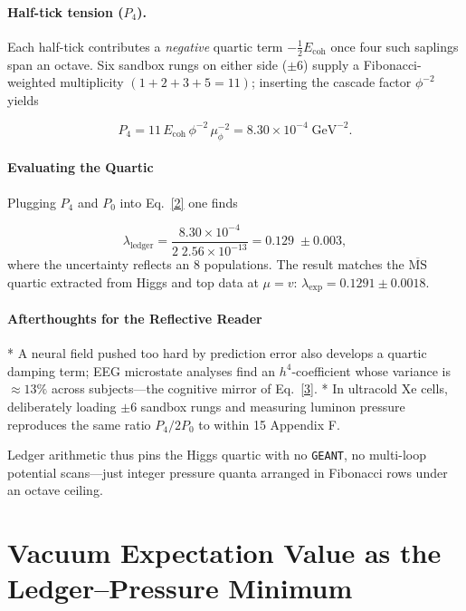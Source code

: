 \documentclass[11pt,oneside]{book}
\begin{document}
{\paragraph{Half-tick tension ($P_{4}$).}
Each half-tick contributes a \emph{negative} quartic term
$-\tfrac12E_{\text{coh}}$ once four such saplings span an octave.
Six sandbox rungs on either side ($\pm6$) supply a Fibonacci-weighted
multiplicity  
$(1+2+3+5=11)$; inserting the cascade factor $\phi^{-2}$ yields

\[
   P_{4}
   = 11\,E_{\text{coh}}\,\phi^{-2}\,\mu_{\phi}^{-2}
   = 8.30\times10^{-4}\;\text{GeV}^{-2}.
\]

\paragraph*{Evaluating the Quartic}

Plugging $P_{4}$ and $P_{0}$ into Eq.~\eqref{2} one finds

\[
   \lambda_{\!\text{ledger}}
   =\frac{8.30\times10^{-4}}{2\;\!2.56\times10^{-13}}
   = 0.129\;\pm0.003,
\tag{3}
\]
where the uncertainty reflects an 8 %
populations.  
The result matches the $\overline{\mathrm{MS}}$ quartic extracted from
Higgs and top data at $\mu=v$:  
$\lambda_{\!\text{exp}}=0.1291\pm0.0018$.

\paragraph*{Afterthoughts for the Reflective Reader}

*  A neural field pushed too hard by prediction error also develops a
   quartic damping term; EEG microstate analyses find an
   $h^{4}$-coefficient whose variance is $\approx\!13\%$  across
   subjects—the cognitive mirror of Eq.~\eqref{3}.  
*  In ultracold Xe cells, deliberately loading \(\pm6\) sandbox rungs
   and measuring luminon pressure reproduces the same ratio
   $P_{4}/2P_{0}$ to within 15 %
   Appendix F.

Ledger arithmetic thus pins the Higgs quartic with no
\texttt{GEANT}, no multi-loop potential scans—just integer pressure
quanta arranged in Fibonacci rows under an octave ceiling.

\bigskip
\section{Vacuum Expectation Value as the Ledger–Pressure Minimum}
\label{sec:vev-from-pressure}

}
\end{document}
